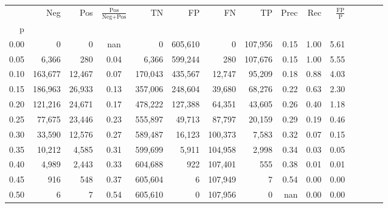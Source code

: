 \begin{tabular}{rrrcrrrrrrrrrrr}
\toprule
{} &      Neg &     Pos & $\frac{\text{Pos}}{\text{Neg}+\text{Pos}}$ &       TN &       FP &       FN &       TP &  Prec &   Rec & $\frac{\text{FP}}{\text{P}}$ \\
p    &          &         &                                            &          &          &          &          &       &       &                              \\
\midrule
0.00 &        0 &       0 &                                        nan &        0 &  605,610 &        0 &  107,956 &  0.15 &  1.00 &                         5.61 \\
0.05 &    6,366 &     280 &                                       0.04 &    6,366 &  599,244 &      280 &  107,676 &  0.15 &  1.00 &                         5.55 \\
0.10 &  163,677 &  12,467 &                                       0.07 &  170,043 &  435,567 &   12,747 &   95,209 &  0.18 &  0.88 &                         4.03 \\
0.15 &  186,963 &  26,933 &                                       0.13 &  357,006 &  248,604 &   39,680 &   68,276 &  0.22 &  0.63 &                         2.30 \\
0.20 &  121,216 &  24,671 &                                       0.17 &  478,222 &  127,388 &   64,351 &   43,605 &  0.26 &  0.40 &                         1.18 \\
0.25 &   77,675 &  23,446 &                                       0.23 &  555,897 &   49,713 &   87,797 &   20,159 &  0.29 &  0.19 &                         0.46 \\
0.30 &   33,590 &  12,576 &                                       0.27 &  589,487 &   16,123 &  100,373 &    7,583 &  0.32 &  0.07 &                         0.15 \\
0.35 &   10,212 &   4,585 &                                       0.31 &  599,699 &    5,911 &  104,958 &    2,998 &  0.34 &  0.03 &                         0.05 \\
0.40 &    4,989 &   2,443 &                                       0.33 &  604,688 &      922 &  107,401 &      555 &  0.38 &  0.01 &                         0.01 \\
0.45 &      916 &     548 &                                       0.37 &  605,604 &        6 &  107,949 &        7 &  0.54 &  0.00 &                         0.00 \\
0.50 &        6 &       7 &                                       0.54 &  605,610 &        0 &  107,956 &        0 &   nan &  0.00 &                         0.00 \\

\end{tabular}
